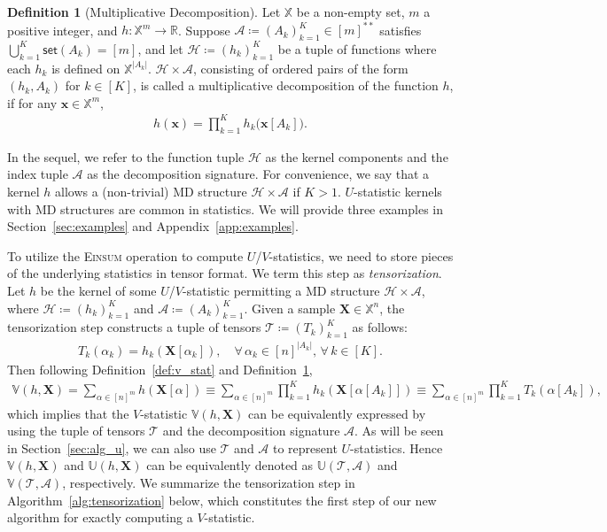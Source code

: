 \documentclass[sn-mathphys, natbib=false]{sn-jnl}
\theoremstyle{plain}
\theoremstyle{definition}
\newtheorem{definition}{Definition}
\def\Einsum{\textsc{Einsum}}
\newcommand{\ustat}{\mathbb{U}}
\newcommand{\vstat}{\mathbb{V}}
\newcommand{\samplespace}{\bbX}
\newcommand{\takesetp}[1]{\mathsf{set}(#1)}
\newcommand{\bbR}{{\mathbb{R}}}
\def\bbX{\mathbb{X}}
\def\calA{\mathcal{A}}
\def\calT{\mathcal{T}}
\def\calH{\mathcal{H}}
\begin{document}
\begin{bibunit}[agsm]
\begin{definition}[Multiplicative Decomposition]\label{def:mul_decomp}
Let $\samplespace$ be a non-empty set, $m$ a positive integer, and $h: \samplespace^m \to \bbR$. Suppose $\calA \coloneqq (A_k)_{k=1}^K \in [m]^{**}$ satisfies $\bigcup_{k=1}^K \takesetp{A_k} = [m]$, and let $\calH \coloneqq (h_k)_{k=1}^K$ be a tuple of functions where each $h_k$ is defined on $\samplespace^{|A_k|}$. $\calH \times \calA$, consisting of ordered pairs of the form $(h_{k}, A_{k})$ for $k \in [K]$, is called a multiplicative decomposition of the function $h$, if for any $\bm{x} \in \samplespace^m$, 
\begin{align*}
h(\bm{x}) = \prod_{k=1}^K h_k\big(\bm{x}[A_k]\big).
\end{align*}
\end{definition}
In the sequel, we refer to the function tuple $\calH$ as the kernel components and the index tuple $\calA$ as the decomposition signature. For convenience, we say that a kernel $h$ allows a (non-trivial) MD structure $\calH \times \calA$ if $K > 1$. $U$-statistic kernels with MD structures are common in statistics. We will provide three examples in Section~\ref{sec:examples} and Appendix~\ref{app:examples}.

To utilize the \Einsum{} operation to compute $U$/$V$-statistics, we need to store pieces of the underlying statistics in tensor format. We term this step as \emph{tensorization}. Let $h$ be the kernel of some $U$/$V$-statistic permitting a MD structure $\calH \times \calA$, where $\calH \coloneqq (h_k)_{k=1}^K$ and $\calA \coloneqq (A_k)^K_{k=1}$. Given a sample $\bm{X} \in \samplespace^n$, the tensorization step constructs a tuple of tensors $\calT \coloneqq (T_k)_{k=1}^K$ as follows:
\begin{align*}
T_k (\alpha_k) = h_k (\bm{X}[\alpha_k]), \quad \forall \, \alpha_k \in [n]^{|A_k|}, \, \forall \, k \in [K].
\end{align*}
Then following Definition~\ref{def:v_stat} and Definition~\ref{def:mul_decomp},
\begin{align}\label{eq:tensorization_v}
\vstat(h, \bm{X}) = \sum_{\alpha \in [n]^m} h(\bm{X}[\alpha]) \equiv \sum_{\alpha \in [n]^m} \prod_{k=1}^K h_k(\bm{X}[\alpha[A_k]]) \equiv \sum_{\alpha \in [n]^m} \prod_{k=1}^K T_k(\alpha[A_k]), 
\end{align}
which implies that the $V$-statistic $\vstat(h, \bm{X})$ can be equivalently expressed by using the tuple of tensors $\calT$ and the decomposition signature $\calA$. As will be seen in Section~\ref{sec:alg_u}, we can also use $\calT$ and $\calA$ to represent $U$-statistics. Hence $\vstat(h, \bm{X})$ and $\ustat(h, \bm{X})$ can be equivalently denoted as $\ustat(\calT, \calA)$ and $\vstat(\calT, \calA)$, respectively. We summarize the tensorization step in Algorithm~\ref{alg:tensorization} below, which constitutes the first step of our new algorithm for exactly computing a $V$-statistic.


\end{bibunit}
\end{document}
